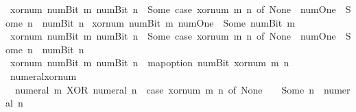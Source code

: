 \begin{isabellebody}
{\isacharbar}{\kern0pt}\ {\isacartoucheopen}xor{\isacharunderscore}{\kern0pt}num\ {\isacharparenleft}{\kern0pt}num{\isachardot}{\kern0pt}Bit{}\ m{\isacharparenright}{\kern0pt}\ {\isacharparenleft}{\kern0pt}num{\isachardot}{\kern0pt}Bit{}\ n{\isacharparenright}{\kern0pt}\ {\isacharequal}{\kern0pt}\ Some\ {\isacharparenleft}{\kern0pt}case\ xor{\isacharunderscore}{\kern0pt}num\ m\ n\ of\ None\ {\isasymRightarrow}\ num{\isachardot}{\kern0pt}One\ {\isacharbar}{\kern0pt}\ Some\ n{\isacharprime}{\kern0pt}\ {\isasymRightarrow}\ num{\isachardot}{\kern0pt}Bit{}\ n{\isacharprime}{\kern0pt}{\isacharparenright}{\kern0pt}{\isacartoucheclose}\isanewline
{\isacharbar}{\kern0pt}\ {\isacartoucheopen}xor{\isacharunderscore}{\kern0pt}num\ {\isacharparenleft}{\kern0pt}num{\isachardot}{\kern0pt}Bit{}\ m{\isacharparenright}{\kern0pt}\ num{\isachardot}{\kern0pt}One\ {\isacharequal}{\kern0pt}\ Some\ {\isacharparenleft}{\kern0pt}num{\isachardot}{\kern0pt}Bit{}\ m{\isacharparenright}{\kern0pt}{\isacartoucheclose}\isanewline
{\isacharbar}{\kern0pt}\ {\isacartoucheopen}xor{\isacharunderscore}{\kern0pt}num\ {\isacharparenleft}{\kern0pt}num{\isachardot}{\kern0pt}Bit{}\ m{\isacharparenright}{\kern0pt}\ {\isacharparenleft}{\kern0pt}num{\isachardot}{\kern0pt}Bit{}\ n{\isacharparenright}{\kern0pt}\ {\isacharequal}{\kern0pt}\ Some\ {\isacharparenleft}{\kern0pt}case\ xor{\isacharunderscore}{\kern0pt}num\ m\ n\ of\ None\ {\isasymRightarrow}\ num{\isachardot}{\kern0pt}One\ {\isacharbar}{\kern0pt}\ Some\ n{\isacharprime}{\kern0pt}\ {\isasymRightarrow}\ num{\isachardot}{\kern0pt}Bit{}\ n{\isacharprime}{\kern0pt}{\isacharparenright}{\kern0pt}{\isacartoucheclose}\isanewline
{\isacharbar}{\kern0pt}\ {\isacartoucheopen}xor{\isacharunderscore}{\kern0pt}num\ {\isacharparenleft}{\kern0pt}num{\isachardot}{\kern0pt}Bit{}\ m{\isacharparenright}{\kern0pt}\ {\isacharparenleft}{\kern0pt}num{\isachardot}{\kern0pt}Bit{}\ n{\isacharparenright}{\kern0pt}\ {\isacharequal}{\kern0pt}\ map{\isacharunderscore}{\kern0pt}option\ num{\isachardot}{\kern0pt}Bit{}\ {\isacharparenleft}{\kern0pt}xor{\isacharunderscore}{\kern0pt}num\ m\ n{\isacharparenright}{\kern0pt}{\isacartoucheclose}\isanewline
\isanewline
{}\isamarkupfalse%
\ numeral{\isacharunderscore}{\kern0pt}xor{\isacharunderscore}{\kern0pt}num{\isacharcolon}{\kern0pt}\isanewline
\ \ {\isacartoucheopen}numeral\ m\ XOR\ numeral\ n\ {\isacharequal}{\kern0pt}\ {\isacharparenleft}{\kern0pt}case\ xor{\isacharunderscore}{\kern0pt}num\ m\ n\ of\ None\ {\isasymRightarrow}\ {}\ {\isacharbar}{\kern0pt}\ Some\ n{\isacharprime}{\kern0pt}\ {\isasymRightarrow}\ numeral\ n{\isacharprime}{\kern0pt}{\isacharparenright}{\kern0pt}{\isacartoucheclose}\isanewline

\end{isabellebody}
